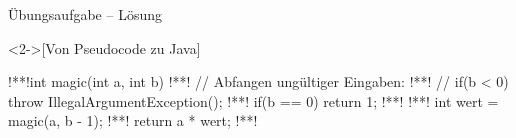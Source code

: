 \begin{frame}[fragile,c]{Übungsaufgabe -- Lösung}
    \begin{solve}<2->[Von Pseudocode zu Java]
\begin{plainjava}
!**!int magic(int a, int b) {
!**!    // Abfangen ungültiger Eingaben:
!**!    // if(b < 0) throw IllegalArgumentException();
!**!    if(b == 0) return 1;
!**!
!**!    int wert = magic(a, b - 1);
!**!    return a * wert;
!**!}
\end{plainjava}
    \end{solve}
\end{frame}

